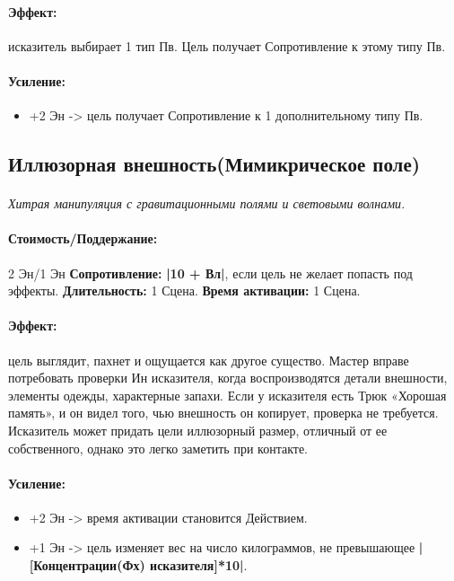 \paragraph{Эффект: }исказитель выбирает 1 тип Пв. Цель получает Сопротивление к этому типу Пв.
\paragraph{Усиление:}
\begin{itemize}
\item+2 Эн -> цель получает Сопротивление к 1 дополнительному типу Пв.
\end{itemize}
\subsection{Иллюзорная внешность(Мимикрическое поле)}
\paragraph{} 
\textit{Хитрая манипуляция с гравитационными полями и световыми волнами.}
\paragraph{Стоимость/Поддержание: }2 Эн/1 Эн
\newline
\textbf{Сопротивление: }
\textbf{|10 + Вл|}, если цель не желает попасть под эффекты.
\newline 
\textbf{Длительность: }1 Сцена.
\newline 
\textbf{Время активации: }1 Сцена.
\paragraph{Эффект: }цель выглядит, пахнет и ощущается как другое существо. Мастер вправе потребовать проверки Ин исказителя, когда воспроизводятся детали внешности, элементы одежды, характерные запахи. Если у исказителя есть Трюк «Хорошая память», и он видел того, чью внешность он копирует, проверка не требуется. 
\newline Исказитель может придать цели иллюзорный размер, отличный от ее собственного, однако это легко заметить при контакте.
\paragraph{Усиление:}
\begin{itemize}
\item+2 Эн -> время активации становится Действием.
\item+1 Эн -> цель изменяет вес на число килограммов, не превышающее 
\textbf{|[Концентрации(Фх) исказителя]*10|}.
\end{itemize}
